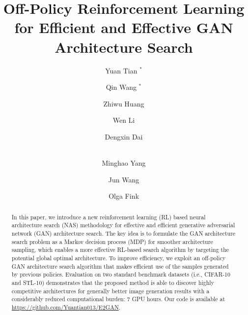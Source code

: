 \documentclass[runningheads]{llncs}
\begin{document}
\pagestyle{headings}
\mainmatter
\def\ECCVSubNumber{173}  

\title{Off-Policy Reinforcement Learning for Efficient and Effective GAN Architecture Search} 


\author{Yuan Tian $^*$ \and
Qin Wang $^*$ \and
Zhiwu Huang \and
Wen Li \and
Dengxin Dai \and\\
Minghao Yang  \and
Jun Wang \and
Olga Fink 
}

{\let\thefootnote\relax{}}
\maketitle
\begin{abstract}
In this paper, we introduce a new reinforcement learning (RL) based neural architecture search (NAS) methodology for effective and efficient generative adversarial network (GAN) architecture search. The key idea is to formulate the GAN architecture search problem as a Markov decision process (MDP) for smoother architecture sampling, which enables a more effective RL-based search algorithm by targeting the potential global optimal architecture. To improve efficiency, we exploit an off-policy GAN architecture search algorithm that makes efficient use of the samples generated by previous policies.
Evaluation on two standard benchmark datasets (i.e., CIFAR-10 and STL-10) demonstrates that the proposed method is able to discover highly competitive architectures for generally better image generation results with a  considerably reduced computational burden: 7 GPU hours. Our code is available at \href{https://github.com/Yuantian013/E2GAN}{https://github.com/Yuantian013/E2GAN}.
\end{abstract}
\end{document}
